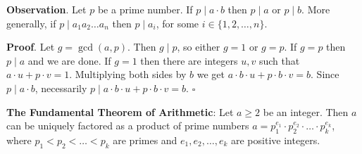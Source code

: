 \documentclass[10pt,varwidth=6in,margin=0.2in,preview]{standalone}
\begin{document}
\begin{flushleft}
\textbf{Observation}. Let $p$ be a prime number. If $p \mid a \cdot b$ then $p \mid a$ or $p \mid b$. More generally, if $p \mid a_1 a_2 \ldots a_n$ then $p \mid a_i$, for some $i \in \{1, 2, \ldots, n\}$.

\textbf{Proof}.
Let $g = \gcd(a, p)$. Then $g \mid p$, so either $g = 1$ or $g = p$.
If $g = p$ then $p \mid a$ and we are done.
If $g = 1$ then there are integers $u, v$ such that $a \cdot u + p \cdot v = 1$.
Multiplying both sides by $b$ we get $a \cdot b \cdot u + p \cdot b \cdot v = b$.
Since $p \mid a \cdot b$, necessarily $p \mid a \cdot b \cdot u + p \cdot b \cdot v = b$. $\square$


\textbf{The Fundamental Theorem of Arithmetic}: Let $a \ge 2$ be an integer. Then $a$ can be uniquely factored as a product of prime numbers $a = p_1^{e_1} \cdot p_2^{e_2} \cdot \ldots \cdot p_k^{e_k}$, where $p_1 < p_2 < \ldots < p_k$ are primes and $e_1, e_2, \ldots, e_k$ are positive integers.


\end{flushleft}
\end{document}
